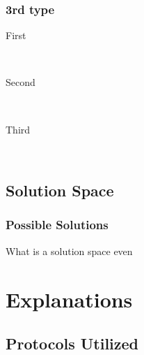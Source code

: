 \documentclass[12pt]{article} %
\begin{document}
\begin{flushleft}

\subsubsection{3rd type} %

\begin{description} %

\item[First] \hfill \\
\lipsum[9] %

\item[Second] \hfill \\
\lipsum[10] %

\item[Third] \hfill \\
\lipsum[11] %

\end{description} 



\subsection{Solution Space} %

\subsubsection{Possible Solutions} %

What is a solution space even


\section{Explanations} %

\lipsum[5] %


\subsection{Protocols Utilized} %


\end{flushleft}
\end{document}
